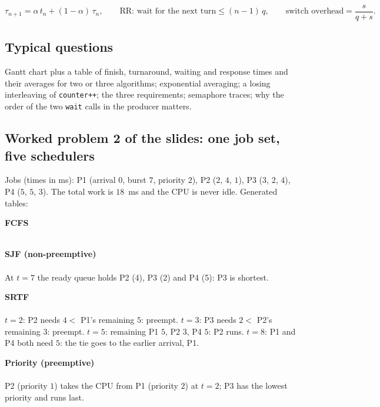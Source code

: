 \documentclass[11pt,a4paper]{article}
\begin{document}
\begin{keyidea}
\[
\tau_{n+1} = \alpha\, t_n + (1-\alpha)\, \tau_n, \qquad
\text{RR: wait for the next turn} \le (n-1)\,q, \qquad
\text{switch overhead} = \frac{s}{q+s}.
\]
\end{keyidea}

\subsection*{Typical questions}
Gantt chart plus a table of finish, turnaround, waiting and response times and their averages for two or three algorithms; exponential averaging; a losing interleaving of \texttt{counter++}; the three requirements; semaphore traces; why the order of the two \texttt{wait} calls in the producer matters.

\subsection{Worked problem 2 of the slides: one job set, five schedulers}
Jobs (times in ms): P1 (arrival $0$, burst $7$, priority $2$), P2 ($2$, $4$, $1$), P3 ($3$, $2$, $4$), P4 ($5$, $5$, $3$). The total work is $18$~ms and the CPU is never idle. Generated tables:

\textbf{FCFS}\\[0.2em]
\\[0.3em]
{\small{}}

\textbf{SJF (non-preemptive)}\\[0.2em]
\\[0.3em]
At $t=7$ the ready queue holds P2 (4), P3 (2) and P4 (5): P3 is shortest.\\
{\small{}}

\textbf{SRTF}\\[0.2em]
\\[0.3em]
$t=2$: P2 needs $4 <$ P1's remaining $5$: preempt. $t=3$: P3 needs $2 <$ P2's remaining $3$: preempt. $t=5$: remaining P1 $5$, P2 $3$, P4 $5$: P2 runs. $t=8$: P1 and P4 both need $5$: the tie goes to the earlier arrival, P1.\\
{\small{}}

\textbf{Priority (preemptive)}\\[0.2em]
\\[0.3em]
P2 (priority $1$) takes the CPU from P1 (priority $2$) at $t=2$; P3 has the lowest priority and runs last.\\
{\small{}}
\end{document}
